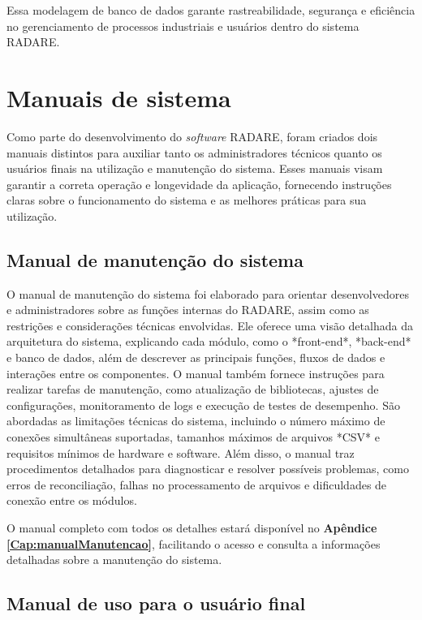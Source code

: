 Essa modelagem de banco de dados garante rastreabilidade, segurança e eficiência no gerenciamento de processos industriais e usuários dentro do sistema RADARE.

\section{Manuais de sistema}

Como parte do desenvolvimento do \textit{software} RADARE, foram criados dois manuais distintos para auxiliar tanto os administradores técnicos quanto os usuários finais na utilização e manutenção do sistema. Esses manuais visam garantir a correta operação e longevidade da aplicação, fornecendo instruções claras sobre o funcionamento do sistema e as melhores práticas para sua utilização.

\subsection{Manual de manutenção do sistema}

O manual de manutenção do sistema foi elaborado para orientar desenvolvedores e administradores sobre as funções internas do RADARE, assim como as restrições e considerações técnicas envolvidas. Ele oferece uma visão detalhada da arquitetura do sistema, explicando cada módulo, como o *front-end*, *back-end* e banco de dados, além de descrever as principais funções, fluxos de dados e interações entre os componentes. O manual também fornece instruções para realizar tarefas de manutenção, como atualização de bibliotecas, ajustes de configurações, monitoramento de logs e execução de testes de desempenho. São abordadas as limitações técnicas do sistema, incluindo o número máximo de conexões simultâneas suportadas, tamanhos máximos de arquivos *CSV* e requisitos mínimos de hardware e software. Além disso, o manual traz procedimentos detalhados para diagnosticar e resolver possíveis problemas, como erros de reconciliação, falhas no processamento de arquivos e dificuldades de conexão entre os módulos. 

O manual completo com todos os detalhes estará disponível no \textbf{Apêndice \ref{Cap:manualManutencao}}, facilitando o acesso e consulta a informações detalhadas sobre a manutenção do sistema.

\subsection{Manual de uso para o usuário final}

